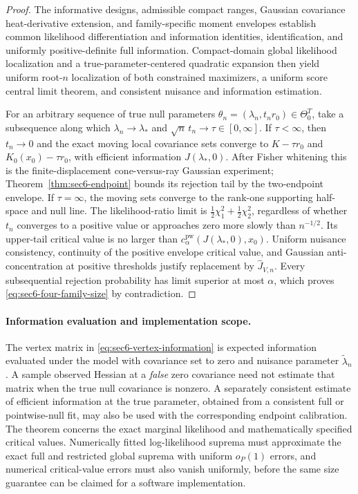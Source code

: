 \begin{proof}
The informative designs, admissible compact ranges,
Gaussian covariance heat-derivative extension, and
family-specific moment envelopes establish common
likelihood differentiation and information identities,
identification, and uniformly positive-definite full
information. Compact-domain global likelihood localization
and a true-parameter-centered quadratic expansion then
yield uniform root-$n$ localization of both constrained
maximizers, a uniform score central limit theorem, and
consistent nuisance and information estimation.

For an arbitrary sequence of true null parameters
$\theta_n=(\lambda_n,t_n r_0)\in\Theta_0^T$, take a
subsequence along which $\lambda_n\to\lambda_*$ and
$\sqrt n\,t_n\to\tau\in[0,\infty]$.
If $\tau<\infty$, then $t_n\to0$ and the exact moving
local covariance sets converge to $K-\tau r_0$ and
$K_0(x_0)-\tau r_0$, with efficient information
$J(\lambda_*,0)$. After Fisher whitening this is the
finite-displacement cone-versus-ray Gaussian experiment;
Theorem~\ref{thm:sec6-endpoint} bounds its rejection
tail by the two-endpoint envelope.
If $\tau=\infty$, the moving sets converge to the
rank-one supporting half-space and null line. The
likelihood-ratio limit is
$\tfrac12\chi_1^2+\tfrac12\chi_2^2$, regardless of
whether $t_n$ converges to a positive value or approaches
zero more slowly than $n^{-1/2}$. Its upper-tail critical
value is no larger than
$c_{\alpha}^{\mathrm{pw}}(J(\lambda_*,0),x_0)$.
Uniform nuisance consistency, continuity of the
positive envelope critical value, and Gaussian
anti-concentration at positive thresholds justify
replacement by $\widehat J_{V,n}$. Every subsequential
rejection probability has limit superior at most
$\alpha$, which proves \eqref{eq:sec6-four-family-size}
by contradiction.
\end{proof}

\paragraph{Information evaluation and implementation scope.}
The vertex matrix in \eqref{eq:sec6-vertex-information}
is expected information evaluated under the model with
covariance set to zero and nuisance parameter
$\widetilde\lambda_n$. A sample observed Hessian at a
\emph{false} zero covariance need not estimate that matrix
when the true null covariance is nonzero. A separately
consistent estimate of efficient information at the true
parameter, obtained from a consistent full or pointwise-null
fit, may also be used with the corresponding endpoint
calibration. The theorem concerns the exact marginal
likelihood and mathematically specified critical values.
Numerically fitted log-likelihood suprema must approximate
the exact full and restricted global suprema with uniform
$o_P(1)$ errors, and numerical critical-value errors must
also vanish uniformly, before the same size guarantee
can be claimed for a software implementation.
